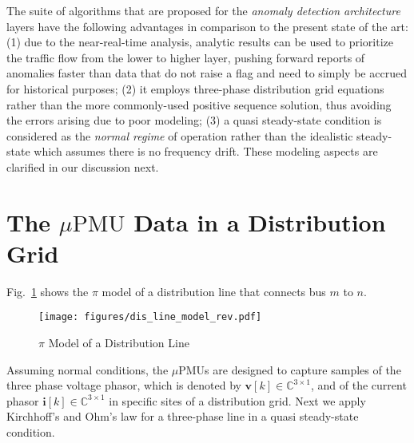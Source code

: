 \documentclass[twocolumn]{IEEEtran}
\newcommand{\mup}{\mu \text{PMU}}
\newcommand{\mb}{\mathbf}
\begin{document}
The suite of algorithms that are proposed for the \textit{anomaly detection architecture} layers have the following advantages in comparison to the present state of the art: (1) due to the near-real-time analysis, analytic results can be used to prioritize the traffic flow from the lower to higher layer, pushing forward reports of anomalies faster than data that do not raise a flag and need to simply be accrued for historical purposes;
(2) it employs three-phase distribution grid equations rather than the more commonly-used positive sequence solution, thus avoiding the errors arising due to poor modeling; (3) a quasi steady-state condition is considered as the {\it normal regime} of operation rather than the idealistic steady-state which assumes there is no frequency drift. 
These modeling aspects are clarified in our discussion next.

      

\section{The $\mup$ Data in a Distribution Grid}\label{sec.model}       
Fig.~\ref{fig:dis_line} shows the $\pi$ model of a distribution line that connects bus $m$ to $n$.   
 \begin{figure}[ht]
 \centering
	\texttt{[image: figures/dis\_line\_model\_rev.pdf]}
	\caption{\small $\pi$ Model of a Distribution Line}
	\vspace{-0.2cm}
	\label{fig:dis_line}
\end{figure} 
Assuming normal conditions, the $\mup$s are designed to capture samples of the three phase voltage phasor, which is denoted by $\mb{v}[k]\in \mathbb{C}^{3\times 1}$, and of the current phasor $\mb{i}[k]\in \mathbb{C}^{3\times 1}$ in specific sites of a distribution grid. Next we apply Kirchhoff's and Ohm's law for a three-phase line in a quasi steady-state condition. 
\end{document}
